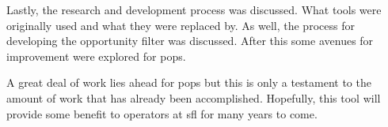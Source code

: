 Lastly, the research and development process was discussed. What tools were
originally used and what they were replaced by. As well, the process for
developing the opportunity filter was discussed. After this some avenues for
improvement were explored for \gls{pops}. 

A great deal of work lies ahead for \gls{pops} but this is only a testament to
the amount of work that has already been accomplished. Hopefully, this tool
will provide some benefit to operators at \gls{sfl} for many years to
come.










